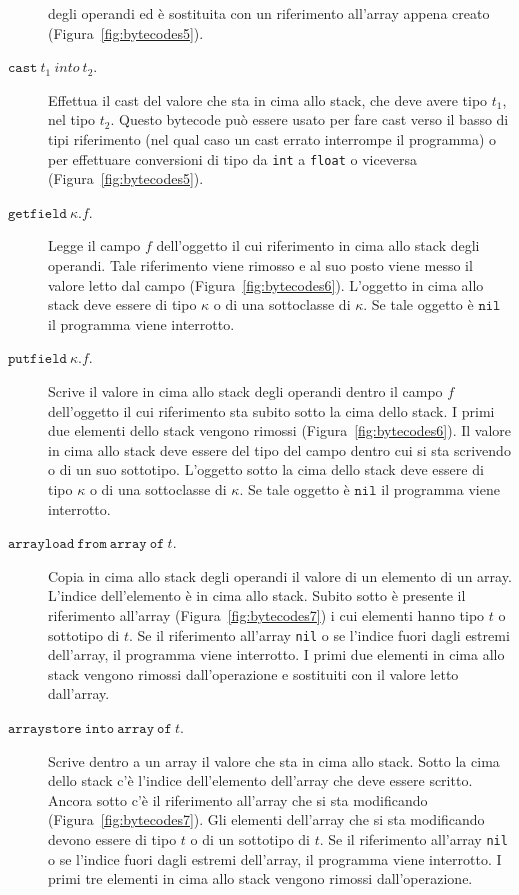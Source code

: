 \begin{description}
  degli operandi ed \`e sostituita con un riferimento all'array appena creato
  (Figura~\ref{fig:bytecodes5}).
\item[\underline{$\mathtt{cast}\ t_1\ \mathit{into}\ t_2$}.]
  Effettua il cast del valore che sta in cima allo stack, che deve avere tipo
  $t_1$, nel tipo $t_2$.
  Questo bytecode pu\`o essere usato per fare cast verso il basso di tipi
  riferimento (nel qual caso un cast errato interrompe il programma)
  o per effettuare conversioni di tipo da \texttt{int} a \texttt{float} o
  viceversa (Figura~\ref{fig:bytecodes5}).
\item[\underline{$\mathtt{getfield\ }\kappa.f$}.]
  Legge il campo $\mathit{f}$ dell'oggetto il cui riferimento \e in cima allo
  stack degli operandi. Tale riferimento viene rimosso e al suo posto viene
  messo il valore letto dal campo (Figura~\ref{fig:bytecodes6}).
  L'oggetto in cima allo stack
  deve essere di tipo $\kappa$ o di una sottoclasse di $\kappa$.
  Se tale oggetto \`e $\mathtt{nil}$ il programma viene interrotto.
\item[\underline{$\mathtt{putfield\ }\kappa.f$}.]
  Scrive il valore in cima allo stack degli operandi dentro
  il campo $f$ dell'oggetto il cui riferimento sta subito sotto
  la cima dello stack. I primi due elementi dello stack vengono rimossi
  (Figura~\ref{fig:bytecodes6}). Il valore in cima allo stack deve essere del
  tipo del campo dentro cui si sta scrivendo o di un suo sottotipo.
  L'oggetto sotto la cima dello stack
  deve essere di tipo $\kappa$ o di una sottoclasse di $\kappa$.
  Se tale oggetto \`e $\mathtt{nil}$ il programma viene interrotto.
\item[\underline{$\mathtt{arrayload\ from\ array\ of\ }\mathit{t}$}.]
  Copia in cima allo stack degli operandi il valore di un elemento di un
  array. L'indice dell'elemento \`e in cima allo stack. Subito sotto
  \`e presente il riferimento all'array
  (Figura~\ref{fig:bytecodes7}) i cui elementi hanno tipo $t$ o
  sottotipo di $t$. Se il riferimento all'array \e \texttt{nil}
  o se l'indice \e fuori dagli estremi dell'array,
  il programma viene interrotto. I primi due
  elementi in cima allo stack vengono rimossi dall'operazione e sostituiti
  con il valore letto dall'array.
\item[\underline{$\mathtt{arraystore\ into\ array\ of\ }\mathit{t}$}.]
  Scrive dentro a un array il valore che sta in cima allo stack. Sotto la cima
  dello stack c'\`e l'indice dell'elemento dell'array che deve essere scritto.
  Ancora sotto c'\`e il riferimento all'array che si sta modificando
  (Figura~\ref{fig:bytecodes7}).
  Gli elementi dell'array che si sta modificando devono essere di tipo $t$ o
  di un sottotipo di $t$. Se il riferimento all'array \e \texttt{nil}
  o se l'indice \e fuori dagli estremi dell'array,
  il programma viene interrotto. I primi tre
  elementi in cima allo stack vengono rimossi dall'operazione.
\end{description}
%
